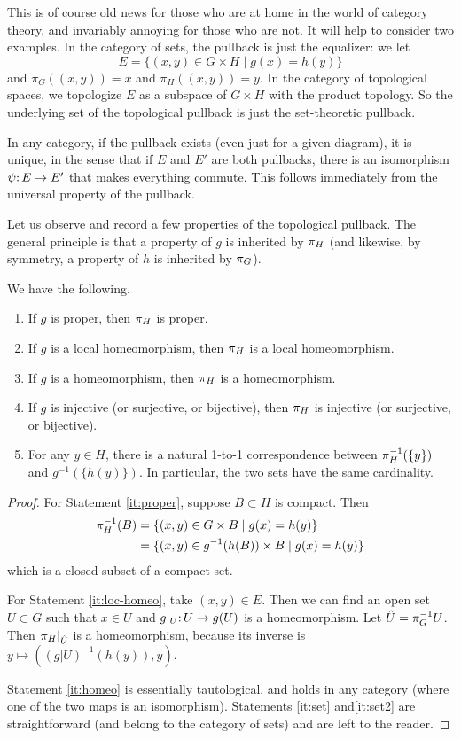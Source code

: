 This is of course old news for those who are at home in the world of  category theory, and invariably annoying for those who are not. It will help to consider two examples. In the category of sets, the pullback is just the equalizer: we let 
$$
E = \{ (x, y) \in G \times H \mid g(x) = h(y) \}
$$
and $\pi_G((x, y)) = x$ and $\pi_H((x, y)) = y$. 
In the category of topological spaces, we topologize $E$ as a subspace of $G \times H$ with the product topology. So the underlying set of the topological pullback is just the set-theoretic pullback. 

In any category, 
if the pullback exists (even just for a given diagram),
it is unique, 
in the sense that if $E$ and $E'$ are both pullbacks, there is an isomorphism $\psi\mathpunct: E \to E'$ that makes everything commute. 
This follows immediately from the universal property of the pullback.

Let us observe and record a few properties of the topological pullback. 
The general principle is that a property of $g$ is inherited by $\pi_H$ (and likewise, by symmetry, a property of $h$ is inherited by $\pi_G$).
\begin{lemma} \label{lem:XYZ}
We have the following.
\begin{enumerate}
\item \label{it:proper}
If $g$ is proper, then $\pi_H$ is proper.
\item \label{it:loc-homeo}
If $g$ is a local homeomorphism, 
then $\pi_H$ is a local homeomorphism. 
\item \label{it:homeo}
If $g$ is a homeomorphism,
then $\pi_H$ is a homeomorphism. 
\item \label{it:set}
If $g$ is injective (or surjective, or bijective),
then $\pi_H$ is injective (or surjective, or bijective).
\item \label{it:set2}
For any $y \in H$, there is a natural 1-to-1 correspondence between $\pi_H^{-1}(\{y\})$ and $g^{-1}(\{ h(y) \})$. In particular, the two sets have the same cardinality. 
\end{enumerate}
\end{lemma}

\begin{proof} 
For Statement \eqref{it:proper},
suppose $B \subset H$ is compact.
Then
\begin{align*}
   \pi_H^{-1} (B) &= \{(x,y)\in G \times B \mid g(x) = h(y) \} \\
 &= \{ (x,y)\in g^{-1}(h(B)) \times B \mid g(x) = h(y) \} 
\end{align*}
which is a closed subset of a compact set.

For Statement \eqref{it:loc-homeo},
take $(x, y) \in E$.
Then we can find an open set $U \subset G$ such that $x \in U$ and $g|_U\mathpunct: U \to g(U)$ is a homeomorphism.
Let $\hat U = \pi_G^{-1} U$. 
Then $\pi_H|_{\hat U}$ is a homeomorphism,
because its inverse is $y \mapsto ((g|U)^{-1}(h(y)), y)$. 

Statement \eqref{it:homeo} is essentially tautological, and holds in any category (where one of the two maps is an isomorphism).
Statements \eqref{it:set} and\eqref{it:set2} are straightforward (and belong to the category of sets) and are left to the reader. 
\end{proof}


